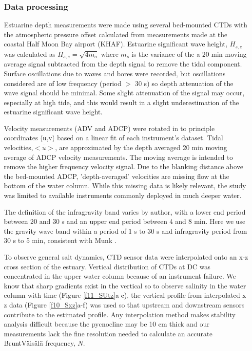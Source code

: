 \subsubsection{Data processing\label{sub:Data-processing}}

Estuarine depth measurements were made using several bed-mounted CTDs
with the atmospheric pressure offset calculated from measurements
made at the coastal Half Moon Bay airport (KHAF). Estuarine significant
wave height, $H_{s,e}$ was calculated as $H_{s,e}=\sqrt{4m_{o}}$
where $m_{o}$ is the variance of the a 20 min moving average signal
subtracted from the depth signal to remove the tidal component. Surface
oscillations due to waves and bores were recorded, but oscillations
considered are of low frequency (period $>$ 30 s) so depth attenuation
of the wave signal should be minimal. Some slight attenuation of the
signal may occur, especially at high tide, and this would result in
a slight underestimation of the estuarine significant wave height.

Velocity measurements (ADV and ADCP) were rotated in to principle
coordinates (u,v) based on a linear fit of each instrument's dataset.
Tidal velocities,$\overline{<u>}$, are approximated by the depth
averaged 20 min moving average of ADCP velocity measurements. The
moving average is intended to remove the higher frequency velocity
signal. Due to the blanking distance above the bed-mounted ADCP, 'depth-averaged'
velocities are missing flow at the bottom of the water column. While
this missing data is likely relevant, the study was limited to available
instruments commonly deployed in much deeper water.

The definition of the infragravity band varies by author, with a lower end period between 20 and 30 s and an upper end period between 4 and 8 min. Here we use the gravity wave band within a period of 1 s to 30 s and infragravity
period from 30 s to 5 min, consistent with Munk \parencite*{munk_origin_1950}.

To observe general salt dynamics, CTD sensor data were interpolated
onto an x-z cross section of the estuary. Vertical distribution of
CTDs at DC was concentrated in the upper water column because of an
instrument failure. We know that sharp gradients exist in the vertical
so to observe salinity in the water column with time (Figure \ref{f11_SUtz}a-c),
the vertical profile from interpolated x-z data (Figure \ref{f10_Sxz}a-f)
was used so that upstream and downstream sensors contribute to the
estimated profile. Any interpolation method makes stability analysis
difficult because the pycnocline may be 10 cm thick and our measurements
lack the fine resolution needed to calculate an accurate Brunt\textendash V\"ais\"al\"a
frequency, $N$.


